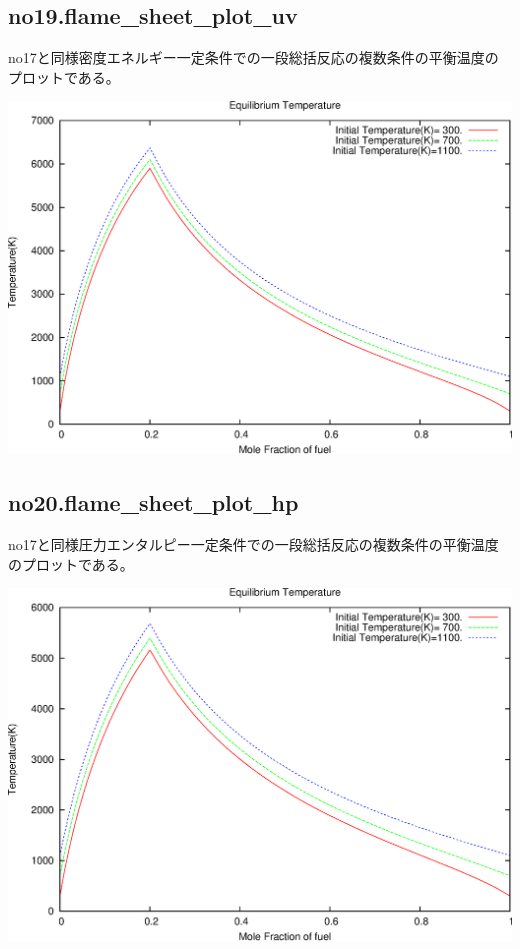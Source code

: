 \documentclass{jsarticle}
\begin{document}
\subsection{no19.flame\_sheet\_plot\_uv}%
no17と同様密度エネルギー一定条件での一段総括反応の複数条件の平衡温度のプロットである。
\begin{center}
\includegraphics[width=.7\textwidth]{sample/no19.eps}
\end{center}
\subsection{no20.flame\_sheet\_plot\_hp}%
no17と同様圧力エンタルピー一定条件での一段総括反応の複数条件の平衡温度のプロットである。
\begin{center}
\includegraphics[width=.7\textwidth]{sample/no20.eps}
\end{center}
\end{document}
